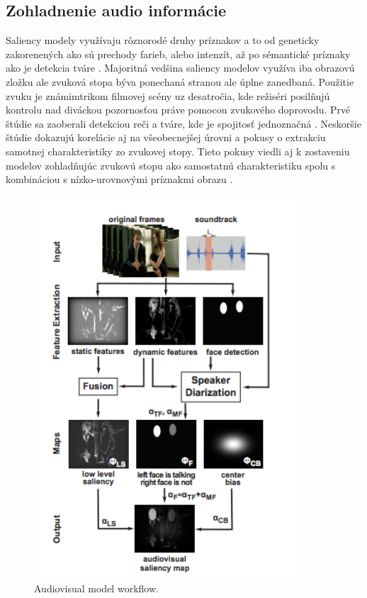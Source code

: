 \subsection{Zohladnenie audio informácie}
Saliency modely využívaju rôznorodé druhy príznakov a to od geneticky zakorenených ako sú prechody farieb, alebo intenzít, až po sémantické príznaky ako je detekcia tváre \cite{salient-faces}. Majoritná vedšina saliency modelov využíva iba obrazovú zložku ale zvuková stopa býva ponechaná stranou ale úplne zanedbaná. Použitie zvuku je známimtrikom filmovej scény uz desatročia, kde režiséri posilňujú kontrolu nad diváckou pozornosťou práve pomocou zvukového doprovodu. Prvé štúdie sa zaoberali detekciou reči a tváre, kde je spojitosť jednoznačná \cite{sound-1}. Neskoršie štúdie dokazujú korelácie aj na všeobecnejšej úrovni a pokusy o extrakciu samotnej charakteristiky zo zvukovej stopy\cite{sound-coutrot-1}. Tieto pokusy viedli aj k zostaveniu modelov zohladňujúc zvukovú stopu ako samostatnú charakteristiku spolu s kombináciou s nízko-urovnovými príznakmi obrazu \cite{sound-courot-2}.

\begin{figure}[H]
  \centering
  \includegraphics[width=10cm]{pics/courot-1.png}
  \caption{Audiovisual model workflow.\cite{sound-courot-2}}\label{wrap-fig:4}
\end{figure}
\vspace{10mm}

